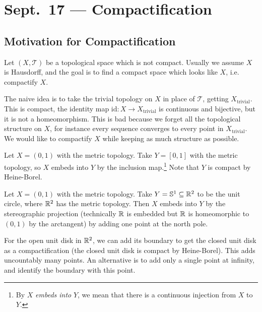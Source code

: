 \chapter{Sept.~17 --- Compactification}

\section{Motivation for Compactification}
Let $(X, \mathcal{T})$ be a topological space which is not compact.
Usually we assume $X$ is Hausdorff, and the goal is
to find a compact space which looks like $X$, i.e.
compactify $X$.

\begin{remark}
  The naive idea is to take the trivial topology
  on $X$ in place of $\mathcal{T}$, getting
  $X_{\text{trivial}}$. This is compact, the identity map
  $\mathrm{id} : X \to X_{\text{trivial}}$ is continuous and
  bijective, but it is not a homeomorphism.
  This is bad because we forget all the topological
  structure on $X$, for instance every sequence
  converges to every point in
  $X_{\text{trivial}}$. We would like to
  compactify $X$ while keeping as much structure
  as possible.
\end{remark}

\begin{example}
  Let $X = (0, 1)$ with the metric topology.
  Take $Y = [0, 1]$ with the metric topology, so
  $X$ embeds into $Y$ by the inclusion map.\footnote{By $X$ \emph{embeds into} $Y$, we mean that there is a continuous injection from $X$ to $Y$.} Note
  that $Y$ is compact by Heine-Borel.
\end{example}

\begin{example}
  Let $X = (0, 1)$ with the metric topology. Take
  $Y = \mathbb{S}^1 \subseteq \mathbb{R}^2$ to be the unit circle,
  where $\mathbb{R}^2$ has the metric topology. Then
  $X$ embeds into $Y$ by the
  stereographic projection (technically $\mathbb{R}$ is
  embedded but $\mathbb{R}$ is homeomorphic to $(0, 1)$
  by the arctangent) by adding one point
  at the north pole.
\end{example}

\begin{example}
  For the open unit disk in $\mathbb{R}^2$, we can add its
  boundary to get the closed unit disk as a
  compactification (the closed unit disk is
  compact by Heine-Borel). This adds uncountably
  many points. An alternative is to add only a
  single point at infinity, and identify the boundary
  with this point.
\end{example}

